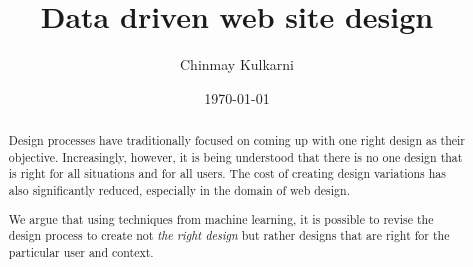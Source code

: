 \documentclass{article}
\title{Data driven web site design}
\author{Chinmay Kulkarni}
\date{\today}
\begin{document}
\maketitle
\begin{abstract}
Design processes have traditionally focused on coming up with one right design as their objective. Increasingly, however, it is being understood that there is no one design that is right for all situations and for all users. The cost of creating design variations has also significantly reduced, especially in the domain of web design. 

We argue that using techniques from machine learning, it is possible to revise the design process to create not {\em the right design} but rather designs that are right for the particular user and context. 
\end{abstract}

\end{document}
